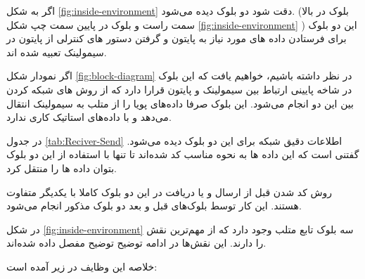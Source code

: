 اگر به شکل 
\ref{fig:inside-environment}
دقت شود دو بلوک 
دیده می‌شود. (بلوک 
در بالا سمت راست و بلوک 
در پایین سمت چپ شکل 
\ref{fig:inside-environment}
)
این دو بلوک برای فرستادن داده های مورد نیاز به پایتون و گرفتن دستور های کنترلی از پایتون در سیمولینک تعبیه شده اند.

\begin{note}
	
	اگر نمودار شکل
	\ref{fig:block-diagram}
	در نظر داشته باشیم، خواهیم یافت که این بلوک در شاخه پایینی ارتباط بین سیمولینک و پایتون قرارا دارد که از روش های شبکه کردن بین این دو انجام می‌شود. این بلوک صرفا داده‌های پویا را از متلب به سیمولینک انتقال می‌دهد و با داده‌های استاتیک کاری ندارد. 
	
\end{note}

در جدول
\ref{tab:Reciver-Send}
اطلاعات دقیق شبکه برای این دو بلوک دیده می‌شود. گفتنی است که این داده ها به نحوه مناسب کد شده‌اند تا تنها با استفاده از این دو بلوک بتوان داده ها را منتقل کرد.


\begin{table}
	\caption{اطلاعات بلوک های فرستندگی گیرندگی در سیمولینک}
	\label{tab:Reciver-Send}
\end{table}


روش کد شدن
قبل از ارسال و یا دریافت در این دو بلوک کاملا با یکدیگر متفاوت هستند. این کار توسط بلوک‌های قبل و بعد دو بلوک مذکور انجام می‌شود. 



در شکل 
\ref{fig:inside-environment}
سه بلوک تابع متلب 
وجود دارد که از مهم‌ترین نقش را دارند. این نقش‌ها در ادامه توضیح توضیح مفصل داده شده‌اند.

خلاصه این وظایف در زیر آمده است:

